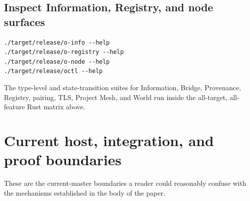 \documentclass[11pt,oneside]{article}
\begin{document}
\subsection{Inspect Information, Registry, and node surfaces}

\begin{lstlisting}[style=plaincode]
./target/release/o-info --help
./target/release/o-registry --help
./target/release/o-node --help
./target/release/octl --help
\end{lstlisting}

The type-level and state-transition suites for Information, Bridge,
Provenance, Registry, pairing, TLS, Project Mesh, and World run inside the
all-target, all-feature Rust matrix above.

\section{Current host, integration, and proof boundaries}
\label{sec:boundaries}

These are the current-master boundaries a reader could reasonably confuse with
the mechanisms established in the body of the paper.
\end{document}
